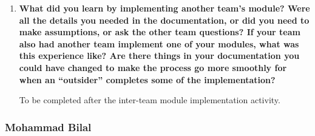 \documentclass[10pt, titlepage]{article}
\begin{document}
\begin{enumerate}
    Another consideration was how to divide the application's
    functionality into software modules. Fewer, larger modules
    could simplify initial development but would make individual
    responsibilities more difficult to separate and maintain.
    A more detailed module decomposition introduces additional
    interfaces and dependencies but improves the system's
    organization, testability, and extensibility.

    The documented modular architecture was selected because
    it provides a reasonable balance between maintainability,
    flexibility, and the practical scope of the capstone project.


    \item \textbf{What did
    you learn by implementing another team's module? Were all the details you
    needed in the documentation, or did you need to make assumptions, or ask
    the other team questions? If your team also had another team implement one
    of your modules, what was this experience like? Are there things in your
    documentation you could have changed to make the process go more smoothly
    for when an ``outsider'' completes some of the implementation?}

    To be completed after the inter-team module implementation activity.

\end{enumerate}

\subsubsection*{Mohammad Bilal}
\end{document}
